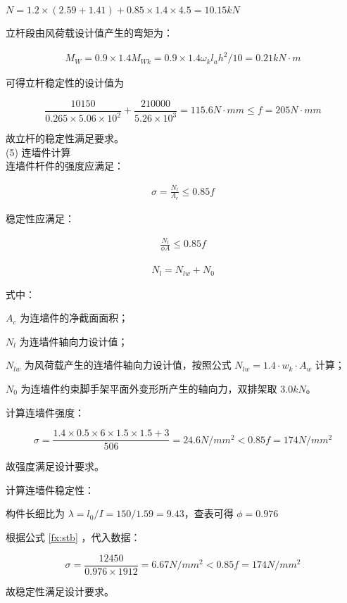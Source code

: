$N=1.2\times (2.59+1.41)+0.85\times 1.4\times 4.5=10.15 kN$

立杆段由风荷载设计值产生的弯矩为：

\begin{align}
    M_W=0.9\times 1.4M_{Wk}=0.9\times 1.4\omega _kl_ah^2/10=0.21kN\cdot m
\end{align}

可得立杆稳定性的设计值为

$$\frac{10150}{0.265×5.06×10^2}+\frac{210000}{5.26×10^3}=115.6 N\cdot mm \leq f=205 N\cdot mm$$

故立杆的稳定性满足要求。\\

(5) 连墙件计算\\

连墙件杆件的强度应满足：

\begin{align}
    \sigma =\frac{N_l}{A_c}\leq 0.85f
\end{align}

稳定性应满足：

\begin{align}
    \label{fx:stb}    
    \frac{N_l}{\phi A}\leq 0.85f
\end{align}

\begin{align}
    N_l=N_{lw}+N_0
\end{align}

式中：

$A_c$ 为连墙件的净截面面积；  

$N_l$ 为连墙件轴向力设计值；   

$N_{lw}$ 为风荷载产生的连墙件轴向力设计值，按照公式 $N_{lw}=1.4\cdot w_k\cdot A_w$ 计算；

$N_0$ 为连墙件约束脚手架平面外变形所产生的轴向力，双排架取 $3.0kN$。

计算连墙件强度： 

$$\sigma=\frac{1.4×0.5×6×1.5×1.5+3}{506}=24.6 N/mm^2<0.85f=174 N/mm^2$$

故强度满足设计要求。

计算连墙件稳定性：

构件长细比为 $\lambda =l_0/I=150/1.59=9.43$，查表可得 $\phi=0.976$

根据公式 \ref{fx:stb} ，代入数据：

$$\sigma =\frac{12450}{0.976\times 1912}=6.67 N/mm^2<0.85f=174 N/mm^2$$

故稳定性满足设计要求。\\

